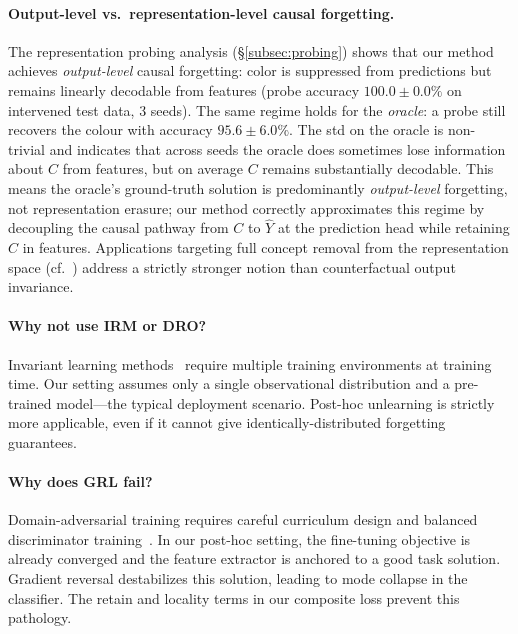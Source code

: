 \documentclass{article}
\begin{document}
\paragraph{Output-level vs.\ representation-level causal forgetting.}
The representation probing analysis (\S\ref{subsec:probing}) shows that
our method achieves \emph{output-level} causal forgetting: color is
suppressed from predictions but remains linearly decodable from features
(probe accuracy $100.0\!\pm\!0.0\%$ on intervened test data, 3 seeds).
The same regime holds for the \emph{oracle}: a probe still recovers
the colour with accuracy $95.6\!\pm\!6.0\%$.  The std on the oracle is
non-trivial and indicates that across seeds the oracle does sometimes lose
information about $C$ from features, but on average $C$ remains
substantially decodable.  This means the oracle's ground-truth solution is
predominantly \emph{output-level} forgetting, not representation erasure;
our method correctly approximates this regime by decoupling the causal
pathway from $C$ to $\hat{Y}$ at the prediction head while retaining $C$ in
features.  Applications targeting full concept removal from the
representation space (cf.\ \cite{belrose2023concept}) address a strictly
stronger notion than counterfactual output invariance.

\paragraph{Why not use IRM or DRO?}
Invariant learning methods~\cite{arjovsky2019irm,sagawa2020dro} require multiple
training environments at training time.  Our setting assumes only a single
observational distribution and a pre-trained model—the typical deployment
scenario.  Post-hoc unlearning is strictly more applicable, even if it cannot
give identically-distributed forgetting guarantees.

\paragraph{Why does GRL fail?}
Domain-adversarial training requires careful curriculum design and balanced
discriminator training~\cite{ganin2016domain}.  In our post-hoc setting, the
fine-tuning objective is already converged and the feature extractor is
anchored to a good task solution.  Gradient reversal destabilizes this
solution, leading to mode collapse in the classifier.  The retain and locality
terms in our composite loss prevent this pathology.
\end{document}
